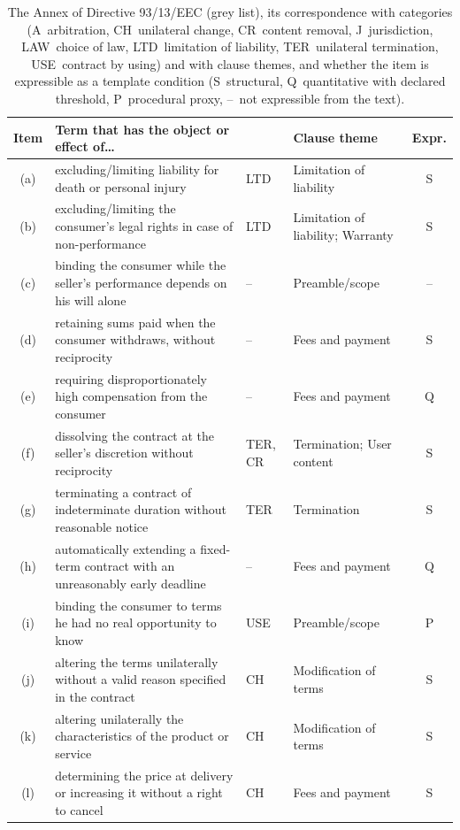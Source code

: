 \begin{table}[t]
\caption{The Annex of Directive 93/13/EEC (grey list), its correspondence with \corpus{} categories (A~arbitration, CH~unilateral change, CR~content removal, J~jurisdiction, LAW~choice of law, LTD~limitation of liability, TER~unilateral termination, USE~contract by using) and with clause themes, and whether the item is expressible as a template condition (S~structural, Q~quantitative with declared threshold, P~procedural proxy, --~not expressible from the text).}
\label{tab:greylist}
\centering
\footnotesize\setlength{\tabcolsep}{3pt}%
\begin{tabular}{@{}c p{5.3cm} p{1.75cm} p{2.7cm} c@{}}
\toprule
Item & Term that has the object or effect of\ldots & \corpus{} & Clause theme & Expr. \\
\midrule
(a) & excluding/limiting liability for death or personal injury & LTD & Limitation of liability & S \\
(b) & excluding/limiting the consumer's legal rights in case of non-performance & LTD & Limitation of liability; Warranty & S \\
(c) & binding the consumer while the seller's performance depends on his will alone & -- & Preamble/scope & -- \\
(d) & retaining sums paid when the consumer withdraws, without reciprocity & -- & Fees and payment & S \\
(e) & requiring disproportionately high compensation from the consumer & -- & Fees and payment & Q \\
(f) & dissolving the contract at the seller's discretion without reciprocity & TER, CR & Termination; User content & S \\
(g) & terminating a contract of indeterminate duration without reasonable notice & TER & Termination & S \\
(h) & automatically extending a fixed-term contract with an unreasonably early deadline & -- & Fees and payment & Q \\
(i) & binding the consumer to terms he had no real opportunity to know & USE & Preamble/scope & P \\
(j) & altering the terms unilaterally without a valid reason specified in the contract & CH & Modification of terms & S \\
(k) & altering unilaterally the characteristics of the product or service & CH & Modification of terms & S \\
(l) & determining the price at delivery or increasing it without a right to cancel & CH & Fees and payment & S \\

\end{tabular}
\end{table}
